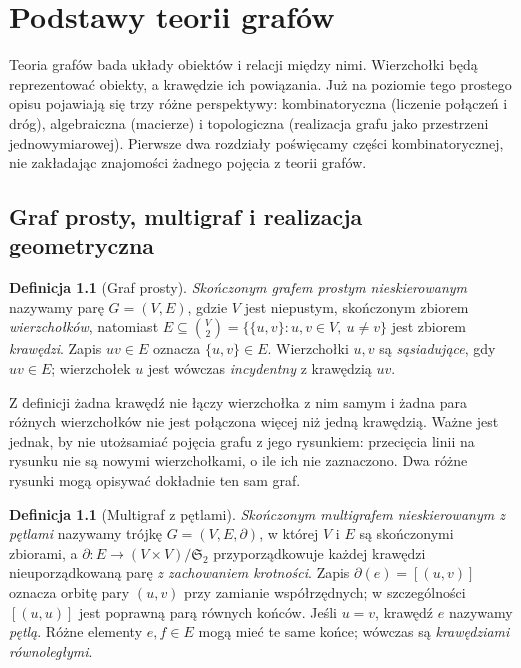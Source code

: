 \documentclass[11pt,a4paper]{report}
\numberwithin{equation}{section}
\theoremstyle{plain}
\theoremstyle{definition}
\newtheorem{definicja}[twierdzenie]{Definicja}
\theoremstyle{remark}
\begin{document}
\chapter{Podstawy teorii grafów}
\label{ch:tg-podstawy}

Teoria grafów bada układy obiektów i relacji między nimi. Wierzchołki będą
reprezentować obiekty, a krawędzie ich powiązania. Już na poziomie tego
prostego opisu pojawiają się trzy różne perspektywy: kombinatoryczna
(liczenie połączeń i dróg), algebraiczna (macierze) i topologiczna
(realizacja grafu jako przestrzeni jednowymiarowej). Pierwsze dwa rozdziały
poświęcamy części kombinatorycznej, nie zakładając znajomości żadnego
pojęcia z teorii grafów.

\section{Graf prosty, multigraf i realizacja geometryczna}
\label{sec:tg-obiekty}

\begin{definicja}[Graf prosty]
\emph{Skończonym grafem prostym nieskierowanym} nazywamy parę
$G=(V,E)$, gdzie $V$ jest niepustym, skończonym zbiorem
\emph{wierzchołków}, natomiast
$E\subseteq\binom V2=\{\{u,v\}:u,v\in V,\ u\ne v\}$
jest zbiorem \emph{krawędzi}. Zapis $uv\in E$ oznacza
$\{u,v\}\in E$. Wierzchołki $u,v$ są \emph{sąsiadujące},
gdy $uv\in E$; wierzchołek $u$ jest wówczas \emph{incydentny}
z krawędzią $uv$.
\end{definicja}

Z definicji żadna krawędź nie łączy wierzchołka z nim samym i żadna para
różnych wierzchołków nie jest połączona więcej niż jedną krawędzią.
Ważne jest jednak, by nie utożsamiać pojęcia grafu z jego rysunkiem:
przecięcia linii na rysunku nie są nowymi wierzchołkami, o ile ich
nie zaznaczono. Dwa różne rysunki mogą opisywać dokładnie ten sam graf.

\begin{definicja}[Multigraf z pętlami]
\emph{Skończonym multigrafem nieskierowanym z pętlami}
nazywamy trójkę $G=(V,E,\partial)$, w której $V$ i $E$ są
skończonymi zbiorami, a $\partial:E\to (V\times V)/\mathfrak S_2$
przyporządkowuje każdej krawędzi nieuporządkowaną parę
\emph{z zachowaniem krotności}. Zapis $\partial(e)=[(u,v)]$
oznacza orbitę pary $(u,v)$ przy zamianie współrzędnych;
w szczególności $[(u,u)]$ jest poprawną parą równych końców.
Jeśli $u=v$, krawędź $e$ nazywamy \emph{pętlą}.
Różne elementy $e,f\in E$ mogą mieć te same końce;
wówczas są \emph{krawędziami równoległymi}.
\end{definicja}
\end{document}
